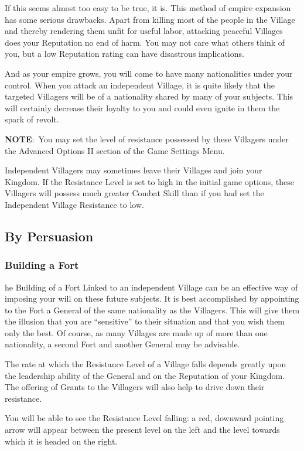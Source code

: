 If this seems almost too easy to be true, it is. This method of empire expansion has some serious drawbacks. Apart from killing most of the people in the Village and thereby rendering them unfit for useful labor, attacking peaceful Villages does your Reputation no end of harm. You may not care what others think of you, but a low Reputation rating can have disastrous implications.

And as your empire grows, you will come to have many nationalities under your control. When you attack an independent Village, it is quite likely that the targeted Villagers will be of a nationality shared by many of your subjects. This will certainly decrease their loyalty to you and could even ignite in them the spark of revolt.

\textbf{NOTE}: You may set the level of resistance possessed by these Villagers under the Advanced Options II section of the Game Settings Menu.

Independent Villagers may sometimes leave their Villages and join your Kingdom. If the Resistance Level is set to high in the initial game options, these Villagers will possess much greater Combat Skill than if you had set the Independent Village Resistance to low.

\subsection{By Persuasion}

\subsubsection{Building a Fort}

he Building of a Fort Linked to an independent Village can be an effective way of imposing your will on these future subjects. It is best accomplished by appointing to the Fort a General of the same nationality as the Villagers. This will give them the illusion that you are “sensitive” to their situation and that you wish them only the best. Of course, as many Villages are made up of more than one nationality, a second Fort and another General may be advisable.

The rate at which the Resistance Level of a Village falls depends greatly upon the leadership ability of the General and on the Reputation of your Kingdom. The offering of Grants to the Villagers will also help to drive down their resistance.

You will be able to see the Resistance Level falling: a red, downward pointing arrow will appear between the present level on the left and the level towards which it is headed on the right.

